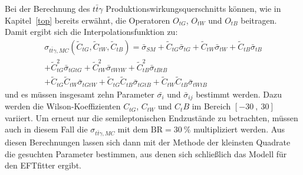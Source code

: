 Bei der Berechnung des $t\bar{t}\gamma$ Produktionswirkungsquerschnitts können, wie in Kapitel~\ref{top} bereits erwähnt, die Operatoren $O_{tG}$, $O_{tW}$ und $O_{tB}$ beitragen. Damit ergibt sich die Interpolationsfunktion zu:
\begin{align}
  \sigma_{t\bar{t}\gamma, MC}({\tilde{C}_{tG}, \tilde{C}_{tW}, \tilde{C}_{tB}}) = \bar{\sigma}_{SM} + \tilde{C}_{tG}\bar{\sigma}_{tG} + \tilde{C}_{tW}\bar{\sigma}_{tW} + \tilde{C}_{tB}\bar{\sigma}_{tB}\\
  + \tilde{C}_{tG}^2\bar{\sigma}_{tGtG} + \tilde{C}_{tW}^2\bar{\sigma}_{tWtW} + \tilde{C}_{tB}^2\bar{\sigma}_{tBtB}\\
  + \tilde{C}_{tG} \tilde{C}_{tW}\bar{\sigma}_{tGtW} + \tilde{C}_{tG} \tilde{C}_{tB}\bar{\sigma}_{tGtB} + \tilde{C}_{tW} \tilde{C}_{tB}\bar{\sigma}_{tWtB}
\end{align}
und es müssen insgesamt zehn Parameter $\bar{\sigma_i}$ und $\bar{\sigma}_{ij}$ bestimmt werden. Dazu werden die Wilson-Koeffizienten $C_{tG}$, $C_{tW}$ und $C_tB$ im Bereich $[-30~,~30]$ variiert. Um erneut nur die semileptonischen Endzustände zu betrachten, müssen auch in diesem Fall die $\sigma_{t\bar{t}\gamma, MC}$ mit dem $\mathrm{BR} = \SI{30}{\percent}$ multipliziert werden. Aus diesen Berechnungen lassen sich dann mit der Methode der kleinsten Quadrate die gesuchten Parameter bestimmen, aus denen sich schließlich das Modell für den EFTfitter ergibt.

